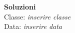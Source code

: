 \documentclass[11pt,a4paper]{article}
\begin{document}
\begin{center}
  {\Large \textbf{Soluzioni}}\\
  Classe: \textit{inserire classe}\\
  Data: \textit{inserire data}
\end{center}

\end{document}
